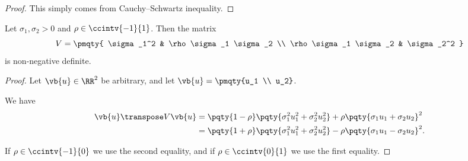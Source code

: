 \begin{proof}
    This simply comes from Cauchy--Schwartz inequality.
\end{proof}

\begin{claim}
    \label{claim:var-mat-corr}%
    Let \(\sigma_1, \sigma_2 > 0\) and \(\rho \in \ccintv{-1}{1}\). Then the matrix
    \[
        V = \pmqty{
            \sigma_1^2 & \rho \sigma_1 \sigma_2 \\
            \rho \sigma_1 \sigma_2 & \sigma_2^2
        }
    \]
    is non-negative definite.
\end{claim}

\begin{proof}
    Let \(\vb{u} \in \RR^2\) be arbitrary, and let \(\vb{u} = \pmqty{u_1 \\ u_2}\).

    We have
    \begin{align*}
        \vb{u}\transpose V \vb{u} &= \pqty{1 - \rho} \pqty{\sigma_1^2 u_1^2 + \sigma_2^2 u_2^2} + \rho \pqty{\sigma_1 u_1 + \sigma_2 u_2}^2 \\
        &= \pqty{1 + \rho} \pqty{\sigma_1^2 u_1^2 + \sigma_2^2 u_2^2} - \rho \pqty{\sigma_1 u_1 - \sigma_2 u_2}^2.
    \end{align*}

    If \(\rho \in \ccintv{-1}{0}\) we use the second equality, and if \(\rho \in \ccintv{0}{1}\) we use the first equality.
\end{proof}